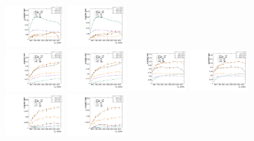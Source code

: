 \begin{figure}[htbp]
  \includegraphics[width=0.2\textwidth]{fig/2Dfit/paramSignalYield_NonVBFSig_mu_LP_bb_HDy.pdf}
  \includegraphics[width=0.2\textwidth]{fig/2Dfit/paramSignalYield_NonVBFSig_e_LP_bb_HDy.pdf}\\
  \includegraphics[width=0.2\textwidth]{fig/2Dfit/paramSignalYield_NonVBFSig_mu_HP_nobb_HDy.pdf}
  \includegraphics[width=0.2\textwidth]{fig/2Dfit/paramSignalYield_NonVBFSig_e_HP_nobb_HDy.pdf}
  \includegraphics[width=0.2\textwidth]{fig/2Dfit/paramSignalYield_NonVBFSig_mu_LP_nobb_HDy.pdf}
  \includegraphics[width=0.2\textwidth]{fig/2Dfit/paramSignalYield_NonVBFSig_e_LP_nobb_HDy.pdf}\\
  \includegraphics[width=0.2\textwidth]{fig/2Dfit/paramSignalYield_NonVBFSig_mu_HP_vbf_HDy.pdf}
  \includegraphics[width=0.2\textwidth]{fig/2Dfit/paramSignalYield_NonVBFSig_e_HP_vbf_HDy.pdf}

\end{figure}
